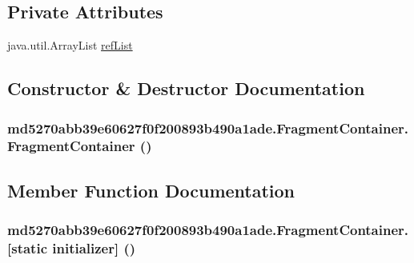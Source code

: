 \subsection*{Private Attributes}
\begin{CompactItemize}
\item 
java.util.ArrayList \hyperlink{classmd5270abb39e60627f0f200893b490a1ade_1_1_fragment_container_b86ceca75650914561141dfeda0cc8f3}{refList}
\end{CompactItemize}


\subsection{Constructor \& Destructor Documentation}
\hypertarget{classmd5270abb39e60627f0f200893b490a1ade_1_1_fragment_container_09060a337c87c0a01b05851c90d3083f}{
\subsubsection[{FragmentContainer}]{\setlength{\rightskip}{0pt plus 5cm}md5270abb39e60627f0f200893b490a1ade.FragmentContainer.FragmentContainer ()}}
\label{classmd5270abb39e60627f0f200893b490a1ade_1_1_fragment_container_09060a337c87c0a01b05851c90d3083f}




\subsection{Member Function Documentation}
\hypertarget{classmd5270abb39e60627f0f200893b490a1ade_1_1_fragment_container_b5bc1e4a0a6335897682cdd46a7b845d}{
\subsubsection[{[static initializer]}]{\setlength{\rightskip}{0pt plus 5cm}md5270abb39e60627f0f200893b490a1ade.FragmentContainer.\mbox{[}static initializer\mbox{]} ()}}
\label{classmd5270abb39e60627f0f200893b490a1ade_1_1_fragment_container_b5bc1e4a0a6335897682cdd46a7b845d}


